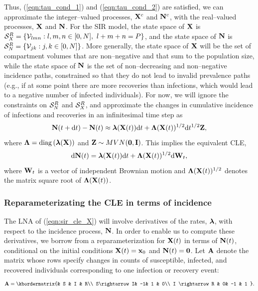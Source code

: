 Thus, (\ref{eqn:tau_cond_1}) and (\ref{eqn:tau_cond_2}) are satisfied, we can approximate the integer--valued processes, $ \mathbf{X}^c $ and $ \mathbf{N}^c $, with the real--valued processes, $ \mathbf{X} $ and $ \mathbf{N} $. For the SIR model, the state space of $ \mathbf{X} $ is $ \mcS_X^R = \lbrace \mcV_{lmn}:l,m,n \in [0,N],\ l+m+n=P\rbrace $, and the state space  of $ \mathbf{N} $ is $ \mathcal{S}_N^R = \lbrace \mathcal{V}_{jk}: j,k \in [0,N] \rbrace $. More generally, the state space of $ \mathbf{X} $ will be the set of compartment volumes that are non--negative and that sum to the population size, while the state space of $ \mathbf{N} $ is the set of non--decreasing and non--negative incidence paths, constrained so that they do not lead to invalid prevalence paths (e.g., if at some point there are more recoveries than infections, which would lead to a negative number of infected individuals). For now, we will ignore the constraints on $ \mathcal{S}_N^R $ and $ \mathcal{S}_X^R $, and approximate the changes in cumulative incidence of infections and recoveries in an infinitesimal time step as 
\begin{equation}
\mathbf{N}(t+\mathrm{d} t) - \mathbf{N}(t) \approx \boldsymbol{\lambda}(\mathbf{X}(t))\mathrm{d} t + \boldsymbol{\Lambda}(\mathbf{X}(t))^{1/2}\mathrm{d} t^{1/2}\mathbf{Z},
\end{equation}
where $ \boldsymbol{\Lambda} = \mathrm{diag}\left (\boldsymbol{\lambda}(\mathbf{X}) \right )$ and $ \mathbf{Z}\sim MVN(\boldsymbol{0},\mathbf{I}) $. This implies the equivalent CLE,
\begin{equation}
\label{eqn:sir_cle_X}
\mathrm{d} \mathbf{N}(t) = \boldsymbol{\lambda}(\mathbf{X}(t))\mathrm{d} t + \boldsymbol{\Lambda}(\mathbf{X}(t))^{1/2}\mathrm{d}\mathbf{W}_t, 
\end{equation}
where $ \mathbf{W}_t $ is a vector of independent Brownian motion and $ \boldsymbol{\Lambda}(\mathbf{X}(t))^{1/2} $ denotes the matrix square root of $ \boldsymbol{\Lambda}(\mathbf{X}(t)) $. 

\subsubsection{Reparameterizating the CLE in terms of incidence}
\label{subsubsec:cle_repar}
The LNA of (\ref{eqn:sir_cle_X}) will involve derivatives of the rates, $ \boldsymbol{\lambda} $, with respect to the incidence process, $ \mathbf{N} $. In order to enable us to compute these derivatives, we borrow from \cite{breto2011compound,ho2016direct} a reparameterization for $ \mathbf{X} (t)$ in terms of $ \mathbf{N}(t) $, conditional on the initial conditions $ \mathbf{X}(t) = \mathbf{x}_0 $ and $ \mathbf{N}(t) = \boldsymbol{0} $. Let $ \mathbf{A} $ denote the matrix whose rows specify changes in counts of susceptible, infected, and recovered individuals corresponding to one infection or recovery event:
\begin{equation}
\label{eqn:sir_stoich}
\bA = \kbordermatrix{& S & I &  R\\
	S\rightarrow I& -1& 1 & 0\\
	I \rightarrow R & 0& -1 & 1
}.
\end{equation}

